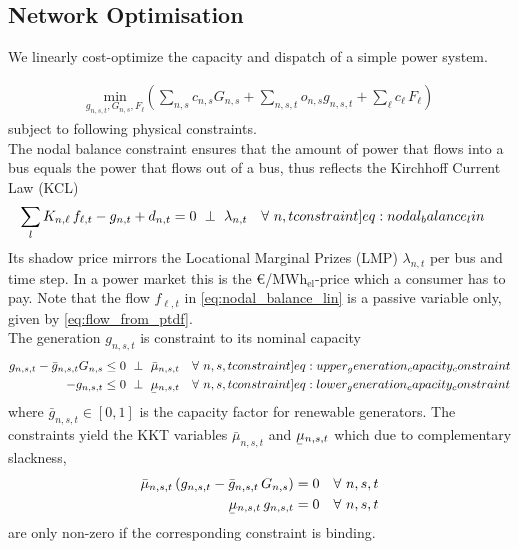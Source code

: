 \documentclass[11pt,twocolumn]{article}
\newcommand{\ubar}[1]{\underaccent{\bar}{#1}}
\newcommand{\generation}[1][n]{g_{#1,s,t}}
\newcommand{\generationpotential}{\bar{g}_{n,s,t}}
\newcommand{\nodalgeneration}[1][n]{g_{#1,t}}
\newcommand{\capacityGeneration}{G_{n,s}}
\newcommand{\capacityFlow}{F_{\ell}}
\newcommand{\capexGeneration}{c_{n,s}}
\newcommand{\capexFlow}{c_{\ell}}
\newcommand{\opexGeneration}[1][n]{o_{#1,s}}
\newcommand{\nodaldemand}[1][n]{d_{#1,t}}
\newcommand{\incidence}[1][n]{K_{#1,\ell}}
\newcommand{\mulowergeneration}[1][n]{\ubar{\mu}_{#1,s,t}}
\newcommand{\muuppergeneration}[1][n]{\bar{\mu}_{#1,s,t}}
\newcommand{\lmp}[1][n]{\lambda_{#1,t}}
\newcommand{\flow}{f_{\ell,t}}
\newcommand{\megawatthour}{MWh$_\text{el}$}
\newcommand{\resultsin}[1]{\hspace{6pt} \bot  \hspace{6pt} #1}
\newcommand{\Forall}[1]{\hspace{10pt} \forall \,\, #1 }
\begin{document}
\subsection{Network Optimisation}

% 
% 

We linearly cost-optimize the capacity and dispatch of a simple power system. 

\begin{align}
    \underset{\generation, \capacityGeneration, \capacityFlow}{\text{min}}
    \left(\sum_{n,s} \capexGeneration \capacityGeneration + \sum_{n, s, t} \opexGeneration \generation + \sum_{\ell} \capexFlow \, \capacityFlow \right) \label{eq:minisation}
\end{align}
subject to following physical constraints. 
\\

The nodal balance constraint ensures that the amount of power that flows into a bus equals the power that flows out of a bus, thus reflects the Kirchhoff Current Law (KCL)
\begin{align}
    \sum_l \incidence \, \flow  - \nodalgeneration + \nodaldemand &= 0 \resultsin{\lmp} \Forall{n,t}
    \label[constraint]{eq:nodal_balance_lin}
\end{align}
Its shadow price mirrors the Locational Marginal Prizes (LMP) $\lmp$ per bus and time step. In a power market this is the \euro/\megawatthour-price which a consumer has to pay. Note that the flow $\flow$ in \cref{eq:nodal_balance_lin} is a passive variable only, given by \cref{eq:flow_from_ptdf}.\\

The generation $\generation$ is constraint to its nominal capacity
\begin{align}
\generation - \generationpotential \capacityGeneration  &\le 0 \resultsin{\muuppergeneration} \Forall{n,s,t} 
\label[constraint]{eq:upper_generation_capacity_constraint}\\ 
- \generation &\le 0 \resultsin{\mulowergeneration} \Forall{n,s,t} 
\label[constraint]{eq:lower_generation_capacity_constraint}
\end{align}
where $\generationpotential \in \left[ 0,1\right]$ is the capacity factor for renewable generators. The constraints yield the KKT variables $\muuppergeneration$ and $\mulowergeneration$ which due to complementary slackness,
\begin{align}
\muuppergeneration \left( \generation - \generationpotential \, \capacityGeneration \right)  &= 0  \Forall{n,s,t} 
\label{eq:complementary_slackness_upper_generation} \\
\mulowergeneration  \, \generation &= 0 \Forall{n,s,t}
\label{eq:complementary_slackness_lower_generation} 
\end{align}
are only non-zero if the corresponding constraint is binding. \\
\end{document}
